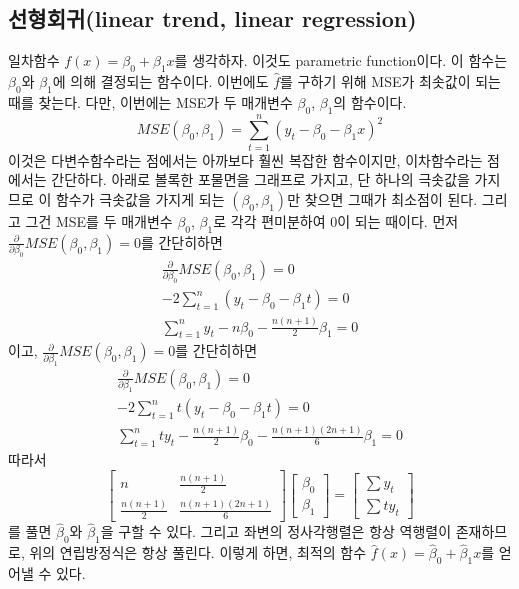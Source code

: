 \documentclass{article}
\begin{document}
\subsection{선형회귀(linear trend, linear regression)}
일차함수 \(f(x)=\beta_0+\beta_1x\)를 생각하자.\footnotemark
{}
이것도 parametric function이다.
이 함수는 \(\beta_0\)와 \(\beta_1\)에 의해 결정되는 함수이다.
이번에도 \(\hat f\)를 구하기 위해 MSE가 최솟값이 되는 때를 찾는다.
다만, 이번에는 MSE가 두 매개변수 \(\beta_0\), \(\beta_1\)의 함수이다.
\[MSE(\beta_0,\beta_1)=\sum_{t=1}^n(y_t-\beta_0-\beta_1x)^2\]
이것은 다변수함수라는 점에서는 아까보다 훨씬 복잡한 함수이지만, 이차함수라는 점에서는 간단하다.
아래로 볼록한 포물면을 그래프로 가지고, 단 하나의 극솟값을 가지므로 이 함수가 극솟값을 가지게 되는 \((\beta_0, \beta_1)\)만 찾으면 그때가 최소점이 된다.
그리고 그건 MSE를 두 매개변수 \(\beta_0\), \(\beta_1\)로 각각 편미분하여 0이 되는 때이다.
먼저 \(\frac{\partial}{\partial\beta_0}MSE(\beta_0,\beta_1)=0\)를 간단히하면
\begin{gather*}
\frac{\partial}{\partial\beta_0}MSE(\beta_0,\beta_1)=0\\
-2\sum_{t=1}^n(y_t-\beta_0-\beta_1t)=0\\
\sum_{t=1}^ny_t-n\beta_0-\frac{n(n+1)}2\beta_1=0
\end{gather*}
이고, \(\frac{\partial}{\partial\beta_1}MSE(\beta_0,\beta_1)=0\)를 간단히하면
\begin{gather*}
\frac{\partial}{\partial\beta_1}MSE(\beta_0,\beta_1)=0\\
-2\sum_{t=1}^nt(y_t-\beta_0-\beta_1t)=0\\
\sum_{t=1}^nty_t-\frac{n(n+1)}2\beta_0-\frac{n(n+1)(2n+1)}6\beta_1=0
\end{gather*}
따라서
\[
\begin{bmatrix}
n&\frac{n(n+1)}2\\
\frac{n(n+1)}2&\frac{n(n+1)(2n+1)}6
\end{bmatrix}
\begin{bmatrix}
\beta_0\\\beta_1
\end{bmatrix}
=
\begin{bmatrix}
\sum y_t\\\sum ty_t
\end{bmatrix}
\]
를 풀면 \(\hat\beta_0\)와 \(\hat\beta_1\)을 구할 수 있다.
그리고 좌변의 정사각행렬은 항상 역행렬이 존재하므로, 위의 연립방정식은 항상 풀린다.
이렇게 하면, 최적의 함수 \(\hat f(x)=\hat\beta_0+\hat\beta_1x\)를 얻어낼 수 있다.
\end{document}
